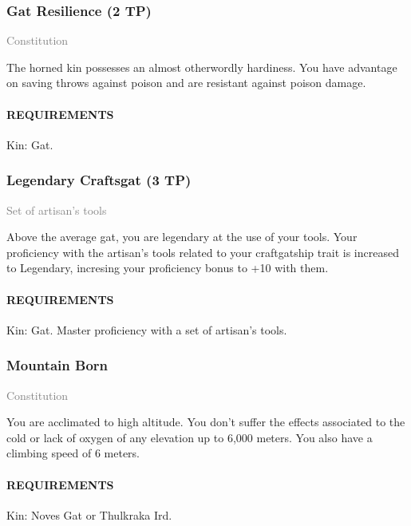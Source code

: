         \subsubsection{Gat Resilience (2 TP)} \label{feat::gatresilience}
        \small{\textcolor{gray}{Constitution}}

        \normalsize
        The horned kin possesses an almost otherwordly hardiness.
        You have advantage on saving throws against poison and are resistant against poison damage.
        \paragraph{REQUIREMENTS} Kin: Gat.

        \subsubsection{Legendary Craftsgat (3 TP)} \label{feat::legendarycraftsgat}
        \small{\textcolor{gray}{Set of artisan's tools}}

        \normalsize
        Above the average gat, you are legendary at the use of your tools.
        Your proficiency with the artisan's tools related to your craftgatship trait is increased to Legendary, incresing your proficiency bonus to +10 with them.
        \paragraph{REQUIREMENTS} Kin: Gat. Master proficiency with a set of artisan's tools.

        \subsubsection{Mountain Born} \label{feat::mountainborn}
        \small{\textcolor{gray}{Constitution}}

        \normalsize
        You are acclimated to high altitude.
        You don't suffer the effects associated to the cold or lack of oxygen of any elevation up to 6,000 meters.
        You also have a climbing speed of 6 meters.
        \paragraph{REQUIREMENTS} Kin: Noves Gat or Thulkraka Ird.


